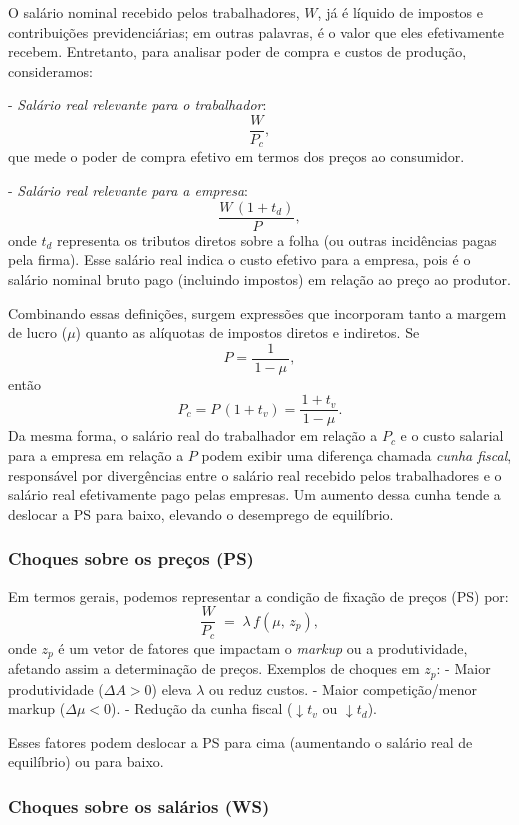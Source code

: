 \documentclass[a4paper,12pt]{article}[abntex2]
\begin{document}
O salário nominal recebido pelos trabalhadores, \(W\), já é líquido de impostos e contribuições previdenciárias; em outras palavras, é o valor que eles efetivamente recebem. Entretanto, para analisar poder de compra e custos de produção, consideramos:

- \emph{Salário real relevante para o trabalhador}: 
  \[
    \frac{W}{P_c},
  \]
  que mede o poder de compra efetivo em termos dos preços ao consumidor.

- \emph{Salário real relevante para a empresa}:
  \[
    \frac{W \,(1 + t_d)}{P},
  \]
  onde \(t_d\) representa os tributos diretos sobre a folha (ou outras incidências pagas pela firma). Esse salário real indica o custo efetivo para a empresa, pois é o salário nominal bruto pago (incluindo impostos) em relação ao preço ao produtor.

Combinando essas definições, surgem expressões que incorporam tanto a margem de lucro (\(\mu\)) quanto as alíquotas de impostos diretos e indiretos. Se
\[
P = \frac{1}{\,1-\mu\,},
\]
então
\[
P_c = P \,(1 + t_v) = \frac{1 + t_v}{\,1-\mu\,}.
\]
Da mesma forma, o salário real do trabalhador em relação a \(P_c\) e o custo salarial para a empresa em relação a \(P\) podem exibir uma diferença chamada \emph{cunha fiscal}, responsável por divergências entre o salário real recebido pelos trabalhadores e o salário real efetivamente pago pelas empresas. Um aumento dessa cunha tende a deslocar a PS para baixo, elevando o desemprego de equilíbrio.

\subsubsection{\textbf{Choques sobre os preços (PS)}}

Em termos gerais, podemos representar a condição de fixação de preços (PS) por:
\[
\frac{W}{P_c} \;=\; \lambda\,f(\mu,\,z_p),
\]
onde \(z_p\) é um vetor de fatores que impactam o \emph{markup} ou a produtividade, afetando assim a determinação de preços. Exemplos de choques em \(z_p\):
- Maior produtividade (\(\Delta A > 0\)) eleva \(\lambda\) ou reduz custos.  
- Maior competição/menor markup (\(\Delta\mu < 0\)).  
- Redução da cunha fiscal (\(\downarrow t_v\) ou \(\downarrow t_d\)).  

Esses fatores podem deslocar a PS para cima (aumentando o salário real de equilíbrio) ou para baixo.

\subsubsection{\textbf{Choques sobre os salários (WS)}}
\end{document}
